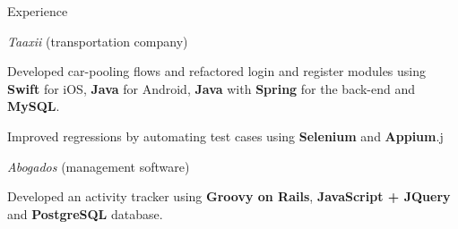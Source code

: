 \documentclass{curriculum}
\begin{document}
\begin{cvsection}{Experience}
\begin{sectionitemlist}
        \item{\textit{Taaxii} (transportation company)}
            \begin{sectionitemlist}
            \item{
                Developed car-pooling flows and refactored login and register
                modules using \textbf{Swift} for iOS, \textbf{Java} for Android,
                \textbf{Java} with \textbf{Spring} for the back-end and \textbf{MySQL}.
            }
            \item{
                Improved regressions by automating test cases
                using \textbf{Selenium} and \textbf{Appium}.j
            }
            \end{sectionitemlist}

        \item{\textit{Abogados} (management software)}
            \begin{sectionitemlist}
            \item{
                Developed an activity tracker using
                \textbf{Groovy on Rails}, \textbf{JavaScript + JQuery}
                and \textbf{PostgreSQL} database.
            }
            \end{sectionitemlist}

        \end{sectionitemlist}

\end{cvsection}

\end{document}

